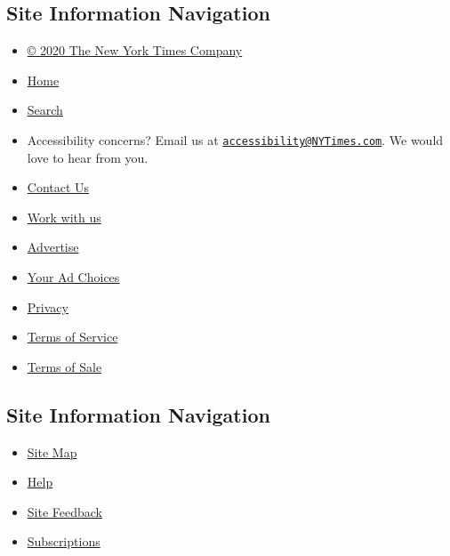 \hypertarget{site-information-navigation}{%
\subsection{Site Information
Navigation}\label{site-information-navigation}}

\begin{itemize}
\tightlist
\item
  \href{https://help.nytimes3xbfgragh.onion/hc/en-us/articles/115014792127-Copyright-notice}{©
  2020 The New York Times Company}
\item
  \href{https://www.nytimes3xbfgragh.onion}{Home}
\item
  \href{https://www.nytimes3xbfgragh.onion/search/}{Search}
\item
  Accessibility concerns? Email us at
  \href{mailto:accessibility@NYTimes.com}{\nolinkurl{accessibility@NYTimes.com}}.
  We would love to hear from you.
\item
  \href{https://help.nytimes3xbfgragh.onion/hc/en-us/articles/115015385887-Contact-Us}{Contact
  Us}
\item
  \href{https://www.nytco.com/careers/}{Work with us}
\item
  \href{https://nytmediakit.com/}{Advertise}
\item
  \href{https://help.nytimes3xbfgragh.onion/hc/en-us/articles/115014892108-Privacy-policy\#pp}{Your
  Ad Choices}
\item
  \href{https://help.nytimes3xbfgragh.onion/hc/en-us/articles/115014892108-Privacy-policy}{Privacy}
\item
  \href{https://help.nytimes3xbfgragh.onion/hc/en-us/articles/115014893428-Terms-of-service}{Terms
  of Service}
\item
  \href{https://help.nytimes3xbfgragh.onion/hc/en-us/articles/115014893968-Terms-of-sale}{Terms
  of Sale}
\end{itemize}

\hypertarget{site-information-navigation-1}{%
\subsection{Site Information
Navigation}\label{site-information-navigation-1}}

\begin{itemize}
\tightlist
\item
  \href{https://spiderbites.nytimes3xbfgragh.onion}{Site Map}
\item
  \href{https://help.nytimes3xbfgragh.onion/hc/en-us}{Help}
\item
  \href{https://help.nytimes3xbfgragh.onion/hc/en-us/articles/115015385887-Contact-Us?redir=myacc}{Site
  Feedback}
\item
  \href{https://www.nytimes3xbfgragh.onion/subscription?campaignId=37WXW}{Subscriptions}
\end{itemize}
